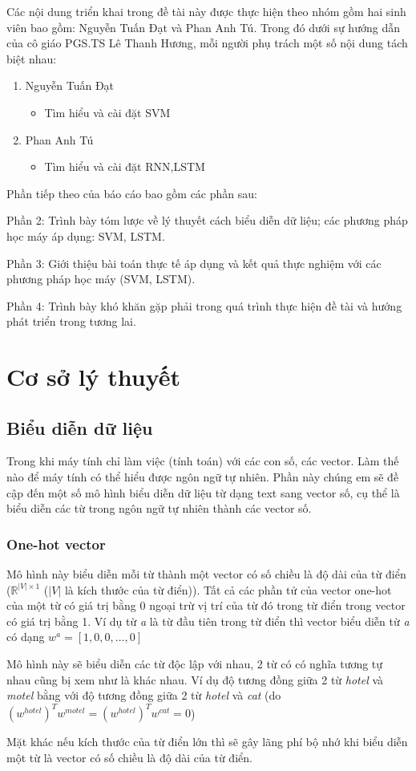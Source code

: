 \documentclass[a4paper,12pt]{report}
\begin{document}
Các nội dung triển khai trong đề tài này được thực hiện theo nhóm gồm hai sinh viên bao gồm: Nguyễn Tuấn Đạt và Phan Anh Tú. Trong đó dưới sự hướng dẫn của cô giáo PGS.TS Lê Thanh Hương, mỗi người phụ trách một số nội dung tách biệt nhau:
\begin{enumerate}
\item Nguyễn Tuấn Đạt
\begin{itemize}
\item Tìm hiểu và cài đặt SVM
\end{itemize}
\item Phan Anh Tú
\begin{itemize}
\item Tìm hiểu và cài đặt RNN,LSTM
\end{itemize}
\end{enumerate}
Phần tiếp theo của báo cáo bao gồm các phần sau:
\par Phần 2: Trình bày tóm lược về lý thuyết cách biểu diễn dữ liệu; các phương pháp học máy áp dụng: SVM, LSTM.
\par Phần 3: Giới thiệu bài toán thực tế áp dụng và kết quả thực nghiệm với các phương pháp học máy (SVM, LSTM).
\par Phần 4: Trình bày khó khăn gặp phải trong quá trình thực hiện đề tài và hướng phát triển trong tương lai.

\chapter{Cơ sở lý thuyết}
\section{Biểu diễn dữ liệu}
Trong khi máy tính chỉ làm việc (tính toán) với các con số, các vector. Làm thế nào để máy tính có thể hiểu được ngôn ngữ tự nhiên. Phần này chúng em sẽ đề cập đến một số mô hình biểu diễn dữ liệu từ dạng text sang vector số, cụ thể là biểu diễn các từ trong ngôn ngữ tự nhiên thành các vector số.
 
\subsection{One-hot vector}
Mô hình này biểu diễn mỗi từ thành một vector có số chiều là độ dài của từ điển ($\mathbb{R}^{|V|\times 1}$ ($|V|$ là kích thước của từ điển)). Tất cả các phần tử của vector one-hot của một từ có giá trị bằng 0 ngoại trừ vị trí của từ đó trong từ điển trong vector có giá trị bằng 1. Ví dụ từ \emph{a} là từ đầu tiên trong từ điển thì vector biểu diễn từ \emph{a} có dạng $w^a = [1,0,0,...,0]$
\par Mô hình này sẽ biểu diễn các từ độc lập với nhau, 2 từ có có nghĩa tương tự nhau cũng bị xem như là khác nhau. Ví dụ độ tương đồng giữa 2 từ \emph{hotel} và \emph{motel} bằng với độ tương đồng giữa 2 từ \emph{hotel} và \emph{cat} (do $(w^{hotel})^Tw^{motel} = (w^{hotel})^Tw^{cat} = 0$)
\par Mặt khác nếu kích thước của từ điển lớn thì sẽ gây lãng phí bộ nhớ khi biểu diễn một từ là vector có số chiều là độ dài của từ điển.
\end{document}

